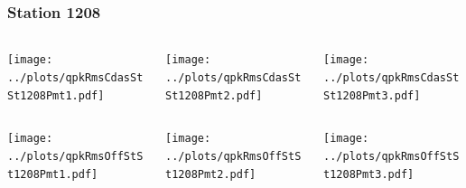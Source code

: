 \documentclass[aspectratio=169]{beamer}
\begin{document}
\begin{frame} 
  \frametitle{Station 1208}
  \begin{center}
    \begin{columns}
      \begin{column}{0.33\textwidth}
        \texttt{[image: ../plots/qpkRmsCdasStSt1208Pmt1.pdf]}
      \end{column}
      \begin{column}{0.33\textwidth}
        \texttt{[image: ../plots/qpkRmsCdasStSt1208Pmt2.pdf]}
      \end{column}
      \begin{column}{0.33\textwidth}
        \texttt{[image: ../plots/qpkRmsCdasStSt1208Pmt3.pdf]}
      \end{column}
    \end{columns}
  \end{center}

  \begin{center}
    \begin{columns}
      \begin{column}{0.33\textwidth}
        \texttt{[image: ../plots/qpkRmsOffStSt1208Pmt1.pdf]}
      \end{column}
      \begin{column}{0.33\textwidth}
        \texttt{[image: ../plots/qpkRmsOffStSt1208Pmt2.pdf]}
      \end{column}
      \begin{column}{0.33\textwidth}
        \texttt{[image: ../plots/qpkRmsOffStSt1208Pmt3.pdf]}
      \end{column}
    \end{columns}
  \end{center}
\end{frame}
\end{document}
